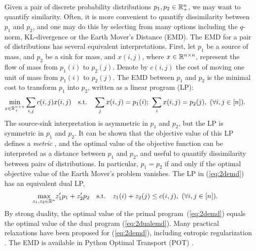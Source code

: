 Given a pair of discrete probability distributions $p_1,p_2\in\mathbb{R}^{n}_+$, we may want to quantify similarity. 
Often, it is more convenient to quantify dissimilarity between $p_1$ and $p_2$, and one may do this by selecting from many options including the $q$-norm, KL-divergence or the Earth Mover's Distance (EMD).
%
The EMD for a pair of distributions has several equivalent interpretations. First, let $p_1$ be a source of mass, and $p_2$ be a sink for mass, and  $x(i,j)$, where  $x\in\mathbb{R}^{n\times n}$, represent the flow of mass from $p_1(i)$ to $p_2(j)$.
Denote by $c(i,j)$ the cost of moving one unit of mass from  $p_1(i)$ to $p_2(j)$.
The EMD between $p_1$ and $p_2$ is the minimal cost to transform $p_1$ into $p_2$, 
written as a linear program (LP):
\begin{align}\label{eq:2demd}
\begin{aligned}
\underset{{x\in \RR^{n\times n}_+}}{\textrm{min}} \sum_{i,j} c(i,j) x(i,j) \quad  \textrm{s.t.}\quad \sum_j x(i,j) &= p_1(i); \ 
\sum_i x(i,j) = p_2(j),\ (\forall i,j\in[n]).
\end{aligned}
\end{align}
The source-sink interpretation is asymmetric in $p_1$ and $p_2$, but the LP is symmetric in $p_1$ and $p_2$.  It can be shown that the objective value of this LP defines a {\em metric} \citep{kantorovich1960mathematical}, and the optimal value of the objective function can be interpreted as a distance between $p_1$ and $p_2$,  %
and useful to quantify dissimilarity between pairs of distributions. In particular,  $p_1=p_2$ if and only if the optimal objective value of the Earth Mover's problem vanishes.
%
The LP in (\ref{eq:2demd}) has an equivalent dual LP, 
\begin{align}\label{eq:2dualemd}\begin{aligned}
    &\underset{z_1,z_2\in\mathbb{R}^{n}}{\textrm{max}} z_1'p_1 + z_2'p_2 \quad 
    \textrm{s.t.}\quad  z_1(i) + z_2(j)\leq c(i,j),\  (\forall i,j\in [n]).
    \end{aligned}
\end{align}
By strong duality, the optimal value of the primal program~(\ref{eq:2demd}) equals the optimal value of the dual program (\ref{eq:2dualemd}). 
Many practical relaxations have been proposed for (\ref{eq:2demd}), including entropic regularization \citep{cuturi2013sinkhorn}.
The EMD is available in Python Optimal Transport (POT) \citep{flamary2021pot}.

